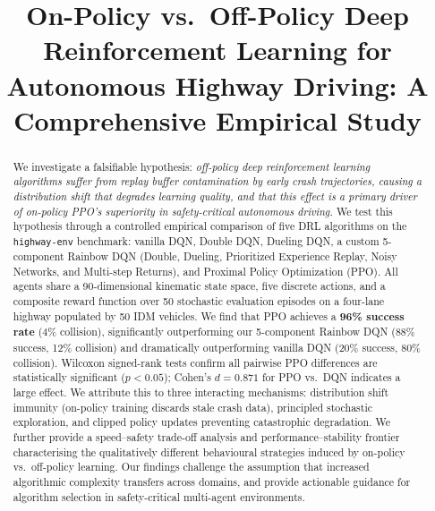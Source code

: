 \documentclass[conference]{IEEEtran}
\begin{document}
\title{On-Policy vs.\ Off-Policy Deep Reinforcement Learning for Autonomous Highway Driving:
A Comprehensive Empirical Study}

\author{
}

\maketitle

\begin{abstract}
We investigate a falsifiable hypothesis: \emph{off-policy deep reinforcement learning
algorithms suffer from replay buffer contamination by early crash trajectories, causing a
distribution shift that degrades learning quality, and that
this effect is a primary driver of on-policy PPO's superiority in safety-critical
autonomous driving.}
We test this hypothesis through a controlled empirical comparison of five DRL algorithms
on the \texttt{highway-env} benchmark: vanilla DQN, Double DQN, Dueling DQN, a custom
5-component Rainbow DQN (Double, Dueling, Prioritized Experience Replay, Noisy Networks,
and Multi-step Returns), and Proximal Policy Optimization (PPO).
All agents share a 90-dimensional kinematic state space, five discrete actions, and a
composite reward function over 50 stochastic evaluation episodes on a four-lane highway
populated by 50 IDM vehicles.
We find that PPO achieves a \textbf{96\% success rate} (4\% collision), significantly
outperforming our 5-component Rainbow DQN (88\% success, 12\% collision) and dramatically
outperforming vanilla DQN (20\% success, 80\% collision).
Wilcoxon signed-rank tests confirm all pairwise PPO differences are statistically
significant ($p < 0.05$); Cohen's $d = 0.871$ for PPO vs.\ DQN indicates a large effect.
We attribute this to three interacting mechanisms: distribution shift immunity
(on-policy training discards stale crash data), principled stochastic exploration,
and clipped policy updates preventing catastrophic degradation.
We further provide a speed--safety trade-off analysis and performance--stability frontier
characterising the qualitatively different behavioural strategies induced by on-policy
vs.\ off-policy learning.
Our findings challenge the assumption that increased algorithmic complexity transfers
across domains, and provide actionable guidance for algorithm selection in
safety-critical multi-agent environments.
\end{abstract}
\end{document}
